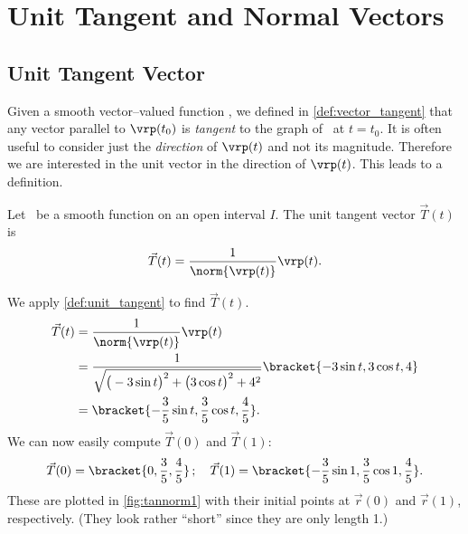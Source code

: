 \section{Unit Tangent and Normal Vectors}\label{sec:tan_norm}

\subsection{Unit Tangent Vector}

Given a smooth vector--valued function \vrt, we defined in \autoref{def:vector_tangent} that any vector parallel to $\vrp(t_0)$ is \emph{tangent} to the graph of \vrt\ at $t=t_0$. It is often useful to consider just the \emph{direction} of $\vrp(t)$ and not its magnitude. Therefore we are interested in the unit vector in the direction of $\vrp(t)$. This leads to a definition.

{Let \vrt\ be a smooth function on an open interval $I$. The unit tangent vector $\vec T(t)$ is
 
\[\vec T(t) = \frac{1}{\rule{0pt}{9pt}\norm{\vrp(t)}}\vrp(t).\]}


{We apply \autoref{def:unit_tangent} to find $\vec T(t)$. 
\begin{align*}
\vec T(t) &= \frac{1}{\rule{0pt}{9pt}\norm{\vrp(t)}}\vrp(t) \\
				&=\frac{1}{\sqrt{\big(-3\sin t\big)^2+\big(3\cos t\big)^2+ 4^2}}\bracket{-3\sin t,3\cos t, 4}\\
				&=\bracket{-\frac35\sin t,\frac35\cos t,\frac45}.
\end{align*}
We can now easily compute $\vec T(0)$ and $\vec T(1)$:
\[\vec T(0) =\bracket{0,\frac35,\frac45}\,;\quad \vec T(1) =\bracket{-\frac35\sin 1,\frac35\cos 1,\frac45}%
.\]
These are plotted in \autoref{fig:tannorm1} with their initial points at $\vec r(0)$ and $\vec r(1)$, respectively. (They look rather ``short'' since they are only length 1.)
%
%
}

